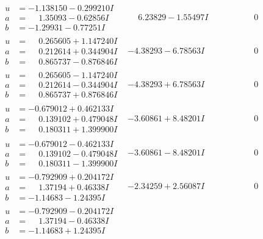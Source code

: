 \documentclass[1p]{elsarticle_modified}
\theoremstyle{definition}
\begin{document}
$$\begin{array}{c|c|c}
\begin{aligned}
u &= -1.138150 - 0.299210 I \\
a &= \phantom{-}1.35093 - 0.62856 I \\
b &= -1.29931 - 0.77251 I\end{aligned}
 & \phantom{-}6.23829 - 1.55497 I & \phantom{-0.000000 } 0 \\ \hline\begin{aligned}
u &= \phantom{-}0.265605 + 1.147240 I \\
a &= \phantom{-}0.212614 + 0.344904 I \\
b &= \phantom{-}0.865737 - 0.876846 I\end{aligned}
 & -4.38293 - 6.78563 I & \phantom{-0.000000 } 0 \\ \hline\begin{aligned}
u &= \phantom{-}0.265605 - 1.147240 I \\
a &= \phantom{-}0.212614 - 0.344904 I \\
b &= \phantom{-}0.865737 + 0.876846 I\end{aligned}
 & -4.38293 + 6.78563 I & \phantom{-0.000000 } 0 \\ \hline\begin{aligned}
u &= -0.679012 + 0.462133 I \\
a &= \phantom{-}0.139102 + 0.479048 I \\
b &= \phantom{-}0.180311 + 1.399900 I\end{aligned}
 & -3.60861 + 8.48201 I & \phantom{-0.000000 } 0 \\ \hline\begin{aligned}
u &= -0.679012 - 0.462133 I \\
a &= \phantom{-}0.139102 - 0.479048 I \\
b &= \phantom{-}0.180311 - 1.399900 I\end{aligned}
 & -3.60861 - 8.48201 I & \phantom{-0.000000 } 0 \\ \hline\begin{aligned}
u &= -0.792909 + 0.204172 I \\
a &= \phantom{-}1.37194 + 0.46338 I \\
b &= -1.14683 - 1.24395 I\end{aligned}
 & -2.34259 + 2.56087 I & \phantom{-0.000000 } 0 \\ \hline\begin{aligned}
u &= -0.792909 - 0.204172 I \\
a &= \phantom{-}1.37194 - 0.46338 I \\
b &= -1.14683 + 1.24395 I\end{aligned}

\end{array}$$
\end{document}
